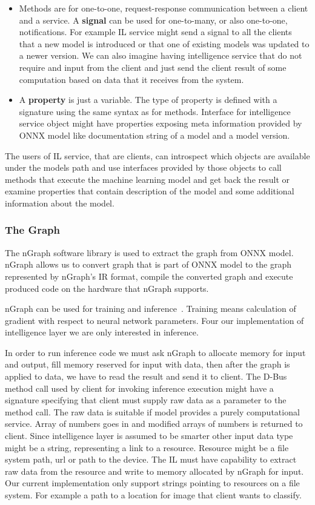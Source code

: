 \documentclass[english, 12pt, a4paper, elec, utf8, online]{aaltothesis}
\begin{document}
\begin{itemize}
\item
Methods are for one-to-one, request-response communication between a client and a service. A \textbf{signal} can be used for one-to-many, or also one-to-one, notifications. For example IL service might send a signal to all the clients that a new model is introduced or that one of existing models was updated to a newer version. We can also imagine having intelligence service that do not require and input from the client and just send the client result of some computation based on data that it receives from the system. 
\item 
A \textbf{property} is just a variable. The type of property is defined with a signature using the same syntax as for methods. Interface for intelligence service object might have properties exposing meta information provided by ONNX model like documentation string of a model and a model version.        
\end{itemize}

The users of IL service, that are clients, can introspect which objects are available under the models path and use interfaces provided by those objects to call methods that execute the machine learning model and get back the result or examine properties that contain description of the model and some additional information about the model.       


\subsubsection{The Graph}
The nGraph software library is used to extract the graph from ONNX model. nGraph allows us to convert graph that is part of ONNX model to the graph represented by nGraph's  IR format, compile the converted graph and execute produced code on the hardware that nGraph supports. 

nGraph can be used for training and inference~\cite{cyphers2018intel}. Training means calculation of gradient with respect to neural network parameters. Four our implementation of intelligence layer we are only interested in inference. 

In order to run inference code we must ask nGraph to allocate memory for input and output, fill memory reserved for input with data, then after the graph is applied to data, we have to read the result and send it to client. The D-Bus method call used by client for invoking inference execution might have a signature specifying that client must supply raw data as a parameter to the method call. The raw data is suitable if model provides a purely computational service. Array of numbers goes in and modified arrays of numbers is returned to client. Since intelligence layer is assumed to be smarter other input data type might be a string, representing a link to a resource. Resource might be a file system path, url or path to the device. The IL must have capability to extract raw data from the resource and write to memory allocated by nGraph for input. Our current implementation only support strings pointing to resources on a file system. For example a path to a location for image that client wants to classify.      
\end{document}
